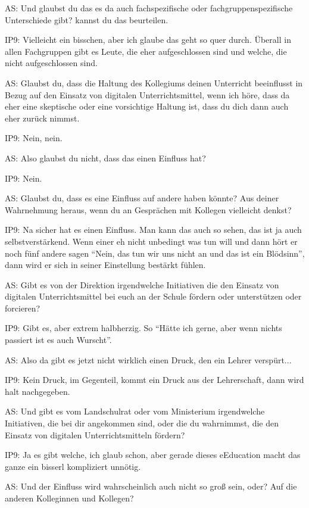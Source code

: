 \documentclass[fontsize=11pt,paper=a4]{scrbook}
\begin{document}
{\begin{itemize*}
\item[AS:] Und glaubst du das es da auch
fachspezifische oder fachgruppenspezifische Unterschiede gibt? kannst du
das beurteilen.
\item[IP9:] Vielleicht ein bisschen, aber ich glaube das geht so quer durch. Überall in allen Fachgruppen gibt es Leute, die eher aufgeschlossen sind und welche, die nicht aufgeschlossen sind.
\item[AS:] Glaubst du, dass die Haltung des
Kollegiums deinen Unterricht beeinflusst
in Bezug auf den Einsatz von digitalen Unterrichtsmittel, wenn ich höre, dass da eher eine skeptische oder eine
vorsichtige Haltung ist, dass du dich dann auch eher zurück nimmst.
\item[IP9:] Nein, nein.
\item[AS:] Also glaubst du nicht, dass das einen Einfluss hat?
\item[IP9:] Nein.
\item[AS:] Glaubst du, dass es eine Einfluss auf andere haben könnte? Aus deiner Wahrnehmung heraus, wenn du an Gesprächen mit Kollegen vielleicht denkst?
\item[IP9:] Na sicher hat es einen Einfluss. Man kann das auch so sehen, das ist ja auch selbstverstärkend. Wenn einer eh nicht unbedingt was tun will und dann hört er noch fünf andere sagen "`Nein, das tun wir uns nicht an und das ist ein Blödsinn"', dann wird er sich in seiner Einstellung bestärkt fühlen.
\item[AS:] Gibt es von der
Direktion irgendwelche Initiativen die
den Einsatz von digitalen
Unterrichtsmittel  bei euch an der Schule fördern oder unterstützen oder forcieren?
\item[IP9:] Gibt es, aber extrem halbherzig. So "`Hätte ich gerne, aber wenn nichts passiert ist es auch Wurscht"'.
\item[AS:] Also da gibt es jetzt nicht wirklich einen Druck, den ein Lehrer verspürt...
\item[IP9:] Kein Druck, im Gegenteil, kommt ein Druck aus der Lehrerschaft, dann wird halt nachgegeben.
\item[AS:] Und gibt es vom Landschulrat oder vom Ministerium irgendwelche Initiativen, die bei dir angekommen sind, oder die du wahrnimmst, die den Einsatz von digitalen Unterrichtsmitteln fördern?
\item[IP9:] Ja es gibt welche, ich glaub schon, aber gerade dieses eEducation macht das ganze ein bisserl kompliziert unnötig.
\item[AS:] Und der Einfluss wird
wahrscheinlich auch nicht so groß sein, oder? Auf die anderen Kolleginnen und  Kollegen?

\end{itemize*}}
\end{document}
